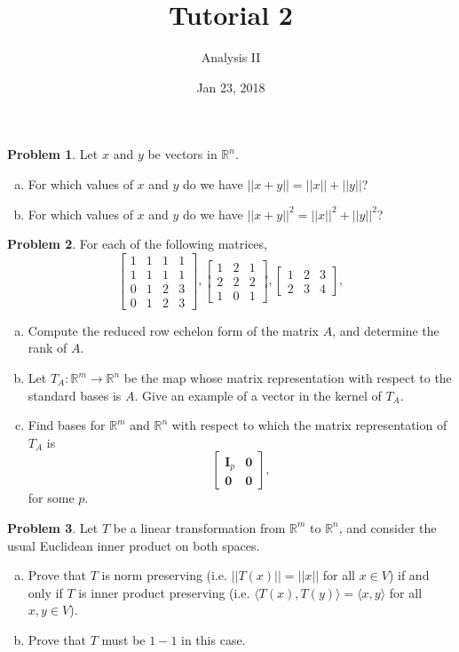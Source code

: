 \documentclass{amsart}
\newcommand{\+}[1]{\ensuremath{\mathbf{#1}}}
\newcommand{\R}{{\mathbb R}}
\theoremstyle{definition}
\newtheorem{prob}{Problem}
\begin{document}
\title{Tutorial 2}
\date{Jan 23, 2018}
\author{Analysis II}

\maketitle

\begin{prob}
Let $x$ and $y$ be vectors in $\R^n$.
\begin{enumerate}[(a)]
\item For which values of $x$ and $y$ do we have $||x + y|| = ||x|| + ||y||$?
\item For which values of $x$ and $y$ do we have $||x + y|| ^2 = ||x||^2 + ||y||^2$?
\end{enumerate}
\end{prob}

\begin{prob}
For each of the following matrices,
\[
\begin{bmatrix}
1 & 1 & 1 & 1 \\ 1 & 1 & 1 & 1 \\ 0 & 1 & 2 & 3 \\  0 & 1 & 2 & 3  
\end{bmatrix},
\begin{bmatrix}
1 & 2 & 1 \\ 2 & 2 & 2 \\ 1 & 0 & 1
\end{bmatrix},
\begin{bmatrix}
1 & 2 & 3 \\ 2 & 3 & 4
\end{bmatrix},
\]
 \begin{enumerate}[(a)]
  \item Compute the reduced row echelon form of the matrix $A$, and determine the rank of $A$.
  \item Let $T_A: \R^m \to \R^n$ be the map whose matrix representation with respect
  to the standard bases is $A$.  Give an example of a vector in the kernel of $T_A$.
  \item Find bases for $\R^m$ and $\R^n$
  with respect to which the matrix representation of $T_A$ is 
\[
  \begin{bmatrix}
\+I_p & \+0 \\ \+0 & \+0
\end{bmatrix},
\]
for some $p$.
 \end{enumerate}
\end{prob}


\begin{prob}
Let $T$ be a linear transformation from $\R^m$ to $\R^n$, and consider the usual Euclidean inner product
on both spaces.
\begin{enumerate}[(a)]
\item Prove that $T$ is norm preserving (i.e. $||T(x)|| = ||x||$ for all $x \in V$)
if and only if $T$ is inner product preserving (i.e. $\langle T(x), T(y) \rangle = \langle x, y \rangle$ for all $x,y \in V$).
\item Prove that $T$ must be $1-1$ in this case. 
\end{enumerate}
\end{prob}
\end{document}
